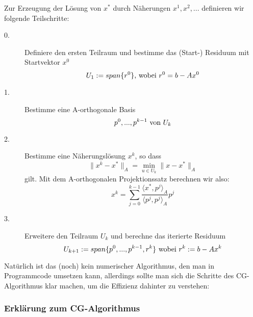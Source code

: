 Zur Erzeugung der Lösung von $x^{*}$ durch Näherungen $x^{1}, x^{2},...$ definieren wir folgende Teilschritte:

\begin{description}

\item[0.] Definiere den ersten Teilraum und bestimme das (Start-) Residuum mit Startvektor $x^{0}$
\begin{equation}
U_{1} := span\{r^{0}\} \textnormal{, wobei } r^{0} = b - Ax^{0}
\end{equation}

\item[1.] Bestimme eine A-orthogonale Basis
\begin{equation}
p^{0},...,p^{k-1} \textnormal{ von } U_{k}
\end{equation}

\item[2.] Bestimme eine Näherungslösung $x^{k}$, so dass
\begin{equation}
\|x^{k} - x^{*}\|_{A} = \underset{u \in U_{k}}{\min} \|x - x^{*}\|_{A}
\end{equation}
gilt. Mit dem A-orthogonalen Projektionssatz berechnen wir also:
\begin{equation}
x^{k} = \sum_{j=0}^{k-1} \frac {\langle x^{*}, p^{j} \rangle _{A}} {\langle p^{j}, p^{j} \rangle _{A}} p^{j}
\end{equation}

\item[3.] Erweitere den Teilraum $U_{k}$ und berechne das iterierte Residuum
\begin{equation}
U_{k+1} := span\{p^{0},...,p^{k-1},r^{k}\} \textnormal{ wobei } r^{k} := b - Ax^{k}
\end{equation}

\end{description}

Natürlich ist das (noch) kein numerischer Algorithmus, den man in Programmcode umsetzen kann, allerdings sollte man sich die Schritte des CG-Algorithmus klar machen, um die Effizienz dahinter zu verstehen:

\subsubsection{Erklärung zum CG-Algorithmus}\label{Erklärung zum CG-Algorithmus}

